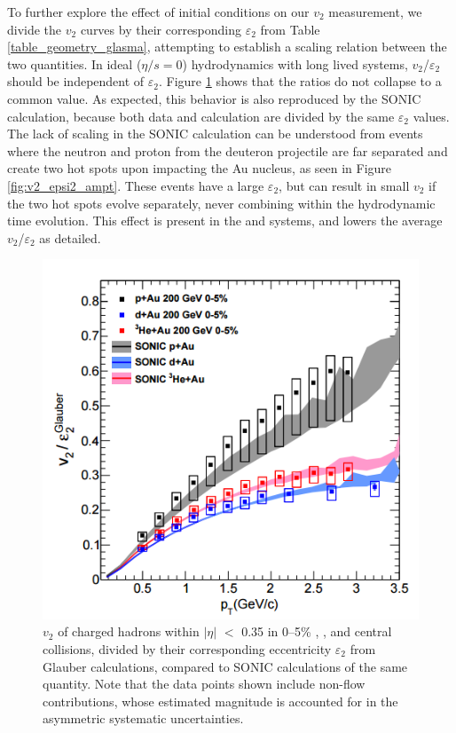 To further explore the effect of initial conditions on our $v_2$ measurement, we divide the $v_2$ curves by their corresponding $\varepsilon_2$ from Table \ref{table_geometry_glasma}, attempting to establish  a scaling relation between the two quantities. In ideal ($\eta/s=0$) hydrodynamics with long lived systems, $v_2$/$\varepsilon_2$ should be independent of $\varepsilon_2$. Figure \ref{fig:v2_divided_epsilon_all_sys} shows that the ratios do not collapse to a common value. As expected, this behavior is also reproduced by the SONIC calculation, because both data and calculation are divided by the same $\varepsilon_2$ values. The lack of scaling in the SONIC calculation can be understood from \dau events where the neutron and proton from the deuteron projectile are far separated and create two hot spots upon impacting the Au nucleus, as seen in Figure \ref{fig:v2_epsi2_ampt}. These events have a large $\varepsilon_2$, but can result in small $v_2$ if the two hot spots evolve separately, never combining within the hydrodynamic time evolution. This effect is present in the \dau and \hau systems, and lowers the average $v_2$/$\varepsilon_2$ as detailed.%

\begin{figure}[!ht]
\begin{center}
\includegraphics[width=0.65\linewidth]{figs/v2_divided_epsilon_all_sys.PNG}
\caption{$v_2$ of charged hadrons within $|\eta|$ $<$ 0.35 in 0--5\% \pau,  \dau, and \hau central collisions, divided by their corresponding eccentricity $\varepsilon_2$ from Glauber calculations, compared to SONIC calculations of the same quantity. Note that the data points shown include non-flow contributions, whose estimated magnitude is accounted for in the asymmetric systematic uncertainties.}
\label{fig:v2_divided_epsilon_all_sys}
\end{center}
\end{figure}

